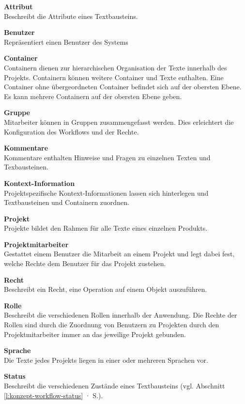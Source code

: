 \textsf{\textbf{Attribut}}\\Beschreibt die Attribute eines Textbausteins.

\textsf{\textbf{Benutzer}}\\Repräsentiert einen Benutzer des Systems

\textsf{\textbf{Container}}\\Containern dienen zur hierarchischen Organisation der Texte innerhalb des Projekts. Containern können weitere Container und Texte enthalten. Eine Container ohne übergeordneten Container befindet sich auf der obersten Ebene. Es kann mehrere Containern auf der obersten Ebene geben.

\textsf{\textbf{Gruppe}}\\Mitarbeiter können in Gruppen zusammengefasst werden. Dies erleichtert die Konfiguration des Workflows und der Rechte.

\textsf{\textbf{Kommentare}}\\Kommentare enthalten Hinweise und Fragen zu einzelnen Texten und Texbausteinen.

\textsf{\textbf{Kontext-Information}}\\Projektspezifische Kontext-Informationen lassen sich hinterlegen und Textbausteinen und Containern zuordnen.

\textsf{\textbf{Projekt}}\\Projekte bildet den Rahmen für alle Texte eines einzelnen Produkts.

\textsf{\textbf{Projektmitarbeiter}}\\Gestattet einem Benutzer die Mitarbeit an einem Projekt und legt dabei fest, welche Rechte dem Benutzer für das Projekt zustehen.

\textsf{\textbf{Recht}}\\Beschreibt ein Recht, eine Operation auf einem Objekt auszuführen.

\textsf{\textbf{Rolle}}\\Beschreibt die verschiedenen Rollen innerhalb der Anwendung. Die Rechte der Rollen sind durch die Zuordnung von Benutzern zu Projekten durch den Projektmitarbeiter immer an das jeweilige Projekt gebunden.

\textsf{\textbf{Sprache}}\\Die Texte jedes Projekts liegen in einer oder mehreren Sprachen vor.

\textsf{\textbf{Status}}\\Beschreibt die verschiedenen Zustände eines Textbausteins (vgl. Abschnitt \ref{l:konzept-workflow-status} · S.\pageref{l:konzept-workflow-status}).

